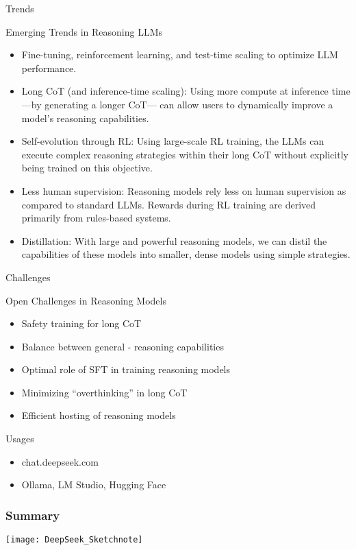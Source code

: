 \begin{frame}[fragile]{ Trends}

Emerging Trends in Reasoning LLMs

    \begin{itemize}
        \item    Fine-tuning, reinforcement learning, and test-time scaling to 
optimize LLM performance. 
        \item    Long CoT (and inference-time scaling):  Using more compute at 
inference time—by generating a longer CoT— can allow users to 
dynamically improve a model’s reasoning capabilities.
        \item    Self-evolution through RL: Using large-scale RL training, the LLMs can 
execute complex reasoning strategies within their long CoT without 
explicitly being trained on this objective. 
        \item    Less human supervision: Reasoning models rely less on human 
supervision as compared to standard LLMs. Rewards during RL training 
are derived primarily from rules-based systems. 
        \item    Distillation: With large and powerful reasoning models, we can distil 
the capabilities of these models into smaller, dense models using 
simple strategies. 
    \end{itemize}
\end{frame}


\begin{frame}[fragile]{ Challenges}

Open Challenges in Reasoning Models

    \begin{itemize}
        \item    Safety training for long CoT
        \item    Balance between general - reasoning capabilities
        \item    Optimal role of SFT in training reasoning models
        \item    Minimizing ``overthinking'' in long CoT
        \item    Efficient hosting of reasoning models
    \end{itemize}
\end{frame}


\begin{frame}[fragile]{ Usages}

    \begin{itemize}
        \item chat.deepseek.com
		\item Ollama, LM Studio, Hugging Face
    \end{itemize}
\end{frame}

\begin{frame}[fragile]\frametitle{ Summary}
		\begin{center}
		\texttt{[image: DeepSeek\_Sketchnote]}
		\end{center}

\end{frame}


